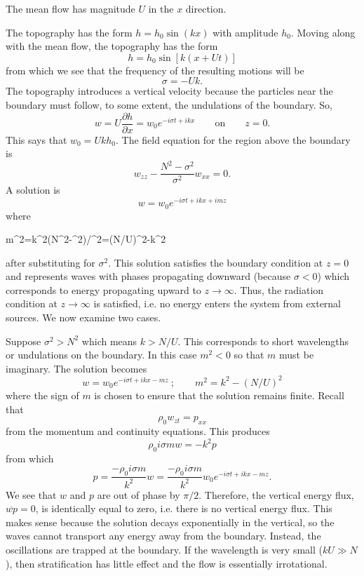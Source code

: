 
The mean flow has magnitude $U$ in the $x$ direction.


The topography has the form $h=h_0\sin(kx)$ with amplitude $h_0$. Moving along with
the mean flow, the topography has the form
\[
	h=h_0\sin[k(x+Ut)]
\]
from which we see that the frequency of the resulting motions will be
\[
	\sigma=-Uk.
\]
The topography introduces a vertical velocity because the particles near the boundary
must follow, to some extent, the undulations of the boundary. So,
\[
	w=U\frac{\partial h}{\partial x}=w_0e^{-i\sigma t+ikx}
	\qquad\text{on}\qquad z=0.
\]
This says that $w_0=Ukh_0$. The field equation for the region above the boundary is
\[
	w_{zz}-\frac{N^2-\sigma^2}{\sigma^2}w_{xx}=0.
\]
A solution is
\[
	w=w_0e^{-i\sigma t+ikx+imz}
\]
where
\begin{waveequation}
	m^2=k^2(N^2-\sigma^2)/\sigma^2=(N/U)^2-k^2
\end{waveequation}

\sourcepagebreak

after substituting for $\sigma^2$. This solution satisfies the boundary condition at $z=0$ and
represents waves with phases propagating downward (because $\sigma<0$) which
corresponds to energy propagating upward to $z\to\infty$. Thus, the radiation condition at
$z\to\infty$ is satisfied, i.e. no energy enters the system from external sources. We now
examine two cases.

Suppose $\sigma^2>N^2$ which means $k>N/U$. This corresponds to short
wavelengths or undulations on the boundary. In this case $m^2<0$ so that $m$ must be
imaginary. The solution becomes
\[
	w=w_0e^{-i\sigma t+ikx-mz}\ ;\qquad
	m^2=k^2-(N/U)^2
\]
where the sign of $m$ is chosen to ensure that the solution remains finite. Recall that
\[
	\rho_0w_{zt}=p_{xx}
\]
from the momentum and continuity equations. This produces
\[
	\rho_0i\sigma mw=-k^2p
\]
from which
\[
	p=\frac{-\rho_0i\sigma m}{k^2}w
	=\frac{-\rho_0i\sigma m}{k^2}w_0e^{-i\sigma t+ikx-mz}.
\]
We see that $w$ and $p$ are out of phase by $\pi/2$. Therefore, the vertical energy flux,
$\overline{wp}=0$, is identically equal to zero, i.e. there is no vertical energy flux. This makes
sense because the solution decays exponentially in the vertical, so the waves cannot
transport any energy away from the boundary. Instead, the oscillations are trapped at
the boundary. If the wavelength is very small ($kU\gg N$), then stratification has little
effect and the flow is essentially irrotational.

